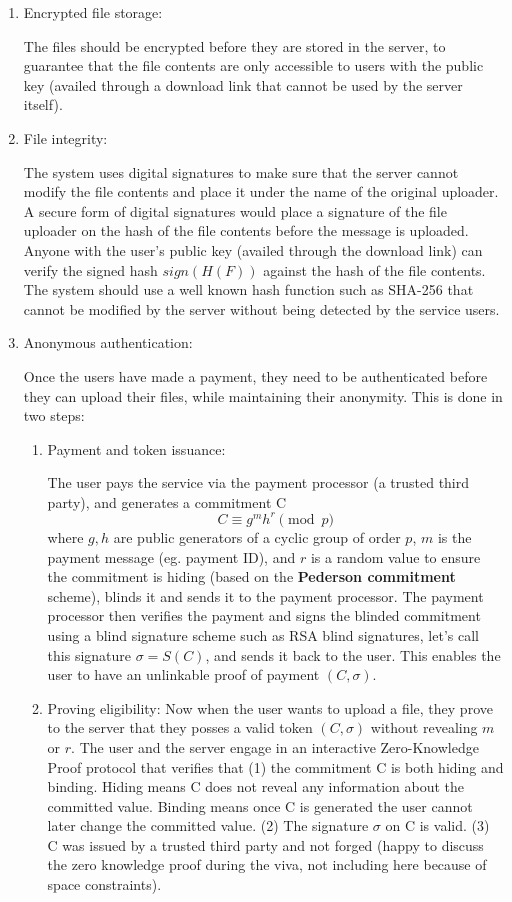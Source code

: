 \documentclass{ashoka-crypto}
\begin{document}
\begin{enumerate}
\item Encrypted file storage:

The files should be encrypted before they are stored in the server, to guarantee that the file contents are only accessible to users with the public key (availed through a download link that cannot be used by the server itself).

\item File integrity:

The system uses digital signatures to make sure that the server cannot modify the file contents and place it under the name of the original uploader. A secure form of digital signatures would place a signature of the file uploader on the hash of the file contents before the message is uploaded. Anyone with the user's public key (availed through the download link) can verify the signed hash $sign(H(F))$ against the hash of the file contents. The system should use a well known hash function such as SHA-256 that cannot be modified by the server without being detected by the service users.

\item Anonymous authentication:

Once the users have made a payment, they need to be authenticated before they can upload their files, while maintaining their anonymity. This is done in two steps:

\begin{enumerate}
\item Payment and token issuance:

The user pays the service via the payment processor (a trusted third party), and generates a commitment C \[C \equiv g^{m}h^r \pmod p\] where $g,h$ are public generators of a cyclic group of order $p$, $m$ is the payment message (eg. payment ID), and $r$ is a random value to ensure the commitment is hiding (based on the \textbf{Pederson commitment} scheme), blinds it and sends it to the payment processor. The payment processor then verifies the payment and signs the blinded commitment using a blind signature scheme such as RSA blind signatures, let's call this signature $\sigma = S(C)$, and sends it back to the user. This enables the user to have an unlinkable proof of payment $(C, \sigma)$. 

\item Proving eligibility:
Now when the user wants to upload a file, they prove to the server that they posses a valid token $(C, \sigma)$ without revealing $m$ or $r$. The user and the server engage in an interactive Zero-Knowledge Proof protocol that verifies that (1) the commitment C is both hiding and binding. Hiding means C does not reveal any information about the committed value. Binding means once C is generated the user cannot later change the committed value. (2) The signature $\sigma$ on C is valid. (3) C was issued by a trusted third party and not forged (happy to discuss the zero knowledge proof during the viva, not including here because of space constraints).
\end{enumerate}


\end{enumerate}
\end{document}
